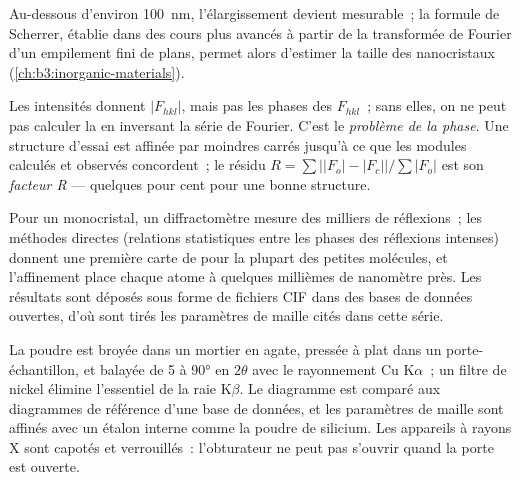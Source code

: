 Au-dessous d'environ \qty{100}{nm}, l'élargissement devient mesurable~;
la formule de Scherrer, établie dans des cours plus avancés à partir de
la transformée de Fourier d'un empilement fini de plans, permet alors
d'estimer la taille des nanocristaux
(\cref{ch:b3:inorganic-materials}).

\begin{definition}\label{def:b3:x-ray-diffraction:refinement}
Les intensités donnent $|F_{hkl}|$, mais pas les phases des $F_{hkl}$~;
sans elles, on ne peut pas calculer la  en inversant
la série de Fourier. C'est le \emph{problème de la phase}. Une
structure d'essai est affinée par moindres carrés jusqu'à ce que les
modules calculés et observés concordent~; le résidu
$R = \sum\big||F_o| - |F_c|\big|/\sum|F_o|$ est son \emph{facteur
R} --- quelques pour cent pour une bonne structure.
\end{definition}

Pour un monocristal, un diffractomètre mesure des milliers de
réflexions~; les méthodes directes (relations statistiques entre les
phases des réflexions intenses) donnent une première carte de  pour la plupart des petites molécules, et l'affinement
place chaque atome à quelques millièmes de nanomètre près. Les résultats
sont déposés sous forme de fichiers CIF dans des bases de données
ouvertes, d'où sont tirés les paramètres de maille cités dans cette
série.

\begin{inthelab}
La poudre est broyée dans un mortier en agate, pressée à plat dans un
porte-échantillon, et balayée de 5 à \ang{90} en $2\theta$ avec le
rayonnement Cu K$\alpha$~; un filtre de nickel élimine l'essentiel de la
raie K$\beta$. Le diagramme est comparé aux diagrammes de référence d'une
base de données, et les paramètres de maille sont affinés avec un étalon
interne comme la poudre de silicium. Les appareils à rayons X sont
capotés et verrouillés~: l'obturateur ne peut pas s'ouvrir quand la
porte est ouverte.
\end{inthelab}

